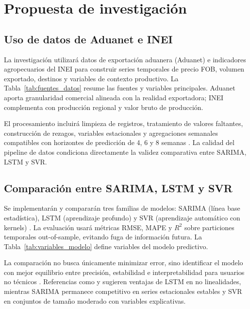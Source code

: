 \section{Propuesta de investigaci\'on}

\subsection{Uso de datos de Aduanet e INEI}

La investigaci\'on utilizar\'a datos de exportaci\'on aduanera (Aduanet) e indicadores agropecuarios del INEI para construir series temporales de precio FOB, volumen exportado, destinos y variables de contexto productivo. La Tabla~\ref{tab:fuentes_datos} resume las fuentes y variables principales. Aduanet aporta granularidad comercial alineada con la realidad exportadora; INEI complementa con producci\'on regional y valor bruto de producci\'on.



El procesamiento incluir\'a limpieza de registros, tratamiento de valores faltantes, construcci\'on de rezagos, variables estacionales y agregaciones semanales compatibles con horizontes de predicci\'on de 4, 6 y 8 semanas \citep{ReisFilho2022, Torres2022}. La calidad del pipeline de datos condiciona directamente la validez comparativa entre SARIMA, LSTM y SVR.

\subsection{Comparaci\'on entre SARIMA, LSTM y SVR}

Se implementar\'an y comparar\'an tres familias de modelos: SARIMA (l\'inea base estad\'istica), LSTM (aprendizaje profundo) y SVR (aprendizaje autom\'atico con kernels) \citep{Kurnadipare2025, Paul2022, Xia2024}. La evaluaci\'on usar\'a m\'etricas RMSE, MAPE y $R^{2}$ sobre particiones temporales out-of-sample, evitando fuga de informaci\'on futura. La Tabla~\ref{tab:variables_modelo} define variables del modelo predictivo.



La comparaci\'on no busca \'unicamente minimizar error, sino identificar el modelo con mejor equilibrio entre precisi\'on, estabilidad e interpretabilidad para usuarios no t\'ecnicos \citep{Theofilou2025}. Referencias como \citet{Kurnadipare2025} y \citet{Xia2024} sugieren ventajas de LSTM en no linealidades, mientras SARIMA permanece competitivo en series estacionales estables y SVR en conjuntos de tama\~no moderado con variables explicativas.

